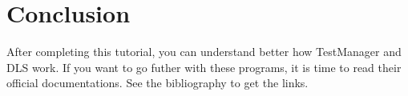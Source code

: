 \chapter{Conclusion}

After completing this tutorial, you can understand better how TestManager
and DLS work.
If you want to go futher with these programs, it is time to read their official
documentations. See the bibliography to get the links.
